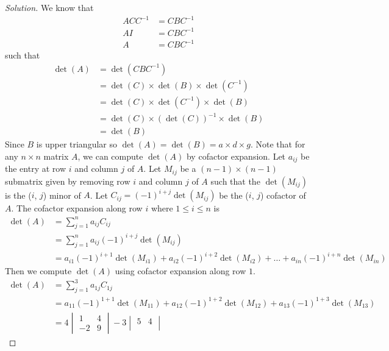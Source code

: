 \documentclass{article}
\theoremstyle{definition}
\begin{document}
\begin{proof}[Solution]
    We know that
    \begin{align*}
        ACC^{-1} &= CBC^{-1} \\
        AI &= CBC^{-1} \\
        A &= CBC^{-1}
    \end{align*}
    such that
    \begin{align*}
        \det(A)
        &= \det(CBC^{-1}) \\
        &= \det(C)\times\det(B)\times\det(C^{-1}) \\
        &= \det(C)\times\det(C^{-1})\times\det(B) \\
        &= \det(C)\times(\det(C))^{-1}\times\det(B) \\
        &= \det(B)
    \end{align*}
    Since \(B\) is upper triangular so \(\det(A)=\det(B)=a\times d \times g\).
    Note that for any \(n \times n\) matrix \(A\), we can compute \(\det(A)\) by cofactor expansion.
    Let \(a_{ij}\) be the entry at row \(i\) and column \(j\) of \(A\).
    Let \(M_{ij}\) be a \((n-1)\times(n-1)\) submatrix given by removing row \(i\) and column \(j\) of \(A\)
    such that the \(\det(M_{ij})\) is the (\(i\), \(j\)) minor of \(A\).
    Let \(C_{ij}=(-1)^{i+j}\det(M_{ij})\) be the (\(i\), \(j\)) cofactor of \(A\).
    The cofactor expansion along row \(i\) where \(1\leq i\leq n\) is
    \begin{align*}
        \det(A) &= \sum_{j=1}^{n} a_{ij}C_{ij} \\
        &= \sum_{j=1}^{n} a_{ij}(-1)^{i+j}\det(M_{ij}) \\
        &= a_{i1}(-1)^{i+1}\det(M_{i1}) + a_{i2}(-1)^{i+2}\det(M_{i2})
        + \dots + a_{in}(-1)^{i+n}\det(M_{in})
    \end{align*}
    Then we compute \(\det(A)\) using cofactor expansion along row \(1\).
    \begin{align*}
        \det(A) &= \sum_{j=1}^{3} a_{1j}C_{1j} \\
        &= a_{11}(-1)^{1+1}\det(M_{11}) + a_{12}(-1)^{1+2}\det(M_{12})
        + a_{13}(-1)^{1+3}\det(M_{13}) \\
        &= 4 \begin{vmatrix}
            1 & 4 \\
            -2 & 9
          \end{vmatrix}
        - 3 \begin{vmatrix}
            5 & 4 \\

\end{vmatrix}
\end{align*}
\end{proof}
\end{document}
